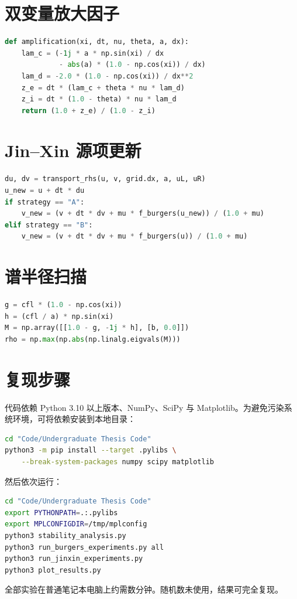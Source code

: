 \section{双变量放大因子}

\begin{lstlisting}[language=Python,caption={离散符号与放大因子}]
def amplification(xi, dt, nu, theta, a, dx):
    lam_c = (-1j * a * np.sin(xi) / dx
             - abs(a) * (1.0 - np.cos(xi)) / dx)
    lam_d = -2.0 * (1.0 - np.cos(xi)) / dx**2
    z_e = dt * (lam_c + theta * nu * lam_d)
    z_i = dt * (1.0 - theta) * nu * lam_d
    return (1.0 + z_e) / (1.0 - z_i)
\end{lstlisting}

\section{Jin--Xin 源项更新}

\begin{lstlisting}[language=Python,caption={策略 A 与策略 B 的源项更新}]
du, dv = transport_rhs(u, v, grid.dx, a, uL, uR)
u_new = u + dt * du
if strategy == "A":
    v_new = (v + dt * dv + mu * f_burgers(u_new)) / (1.0 + mu)
elif strategy == "B":
    v_new = (v + dt * dv + mu * f_burgers(u)) / (1.0 + mu)
\end{lstlisting}

\section{谱半径扫描}

\begin{lstlisting}[language=Python,caption={策略 B 刚性极限的谱半径}]
g = cfl * (1.0 - np.cos(xi))
h = (cfl / a) * np.sin(xi)
M = np.array([[1.0 - g, -1j * h], [b, 0.0]])
rho = np.max(np.abs(np.linalg.eigvals(M)))
\end{lstlisting}

\section{复现步骤}

代码依赖 Python 3.10 以上版本、NumPy、SciPy 与 Matplotlib。为避免污染系统环境，可将依赖安装到本地目录：

\begin{lstlisting}[language=bash,caption={安装依赖}]
cd "Code/Undergraduate Thesis Code"
python3 -m pip install --target .pylibs \
    --break-system-packages numpy scipy matplotlib
\end{lstlisting}

然后依次运行：

\begin{lstlisting}[language=bash,caption={生成图片与数据}]
cd "Code/Undergraduate Thesis Code"
export PYTHONPATH=.:.pylibs
export MPLCONFIGDIR=/tmp/mplconfig
python3 stability_analysis.py
python3 run_burgers_experiments.py all
python3 run_jinxin_experiments.py
python3 plot_results.py
\end{lstlisting}

全部实验在普通笔记本电脑上约需数分钟。随机数未使用，结果可完全复现。
